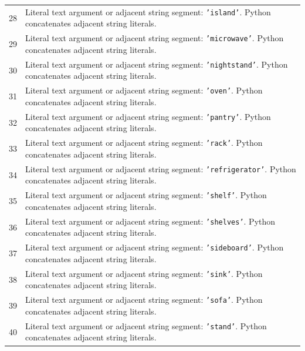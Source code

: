 \documentclass[11pt,a4paper]{book}
\begin{document}
\begin{longtable}{r p{}}
28 & Literal text argument or adjacent string segment: \texttt{'island'}. Python concatenates adjacent string literals. \\

29 & Literal text argument or adjacent string segment: \texttt{'microwave'}. Python concatenates adjacent string literals. \\

30 & Literal text argument or adjacent string segment: \texttt{'nightstand'}. Python concatenates adjacent string literals. \\

31 & Literal text argument or adjacent string segment: \texttt{'oven'}. Python concatenates adjacent string literals. \\

32 & Literal text argument or adjacent string segment: \texttt{'pantry'}. Python concatenates adjacent string literals. \\

33 & Literal text argument or adjacent string segment: \texttt{'rack'}. Python concatenates adjacent string literals. \\

34 & Literal text argument or adjacent string segment: \texttt{'refrigerator'}. Python concatenates adjacent string literals. \\

35 & Literal text argument or adjacent string segment: \texttt{'shelf'}. Python concatenates adjacent string literals. \\

36 & Literal text argument or adjacent string segment: \texttt{'shelves'}. Python concatenates adjacent string literals. \\

37 & Literal text argument or adjacent string segment: \texttt{'sideboard'}. Python concatenates adjacent string literals. \\

38 & Literal text argument or adjacent string segment: \texttt{'sink'}. Python concatenates adjacent string literals. \\

39 & Literal text argument or adjacent string segment: \texttt{'sofa'}. Python concatenates adjacent string literals. \\

40 & Literal text argument or adjacent string segment: \texttt{'stand'}. Python concatenates adjacent string literals. \\


\end{longtable}
\end{document}
